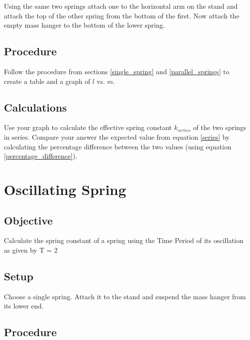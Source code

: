         Using the same two springs attach one to the horizontal arm on the stand and attach the top of the other spring from the bottom of the first. Now attach the empty mass hanger to the bottom of the lower spring.

        

    \subsection*{Procedure}

        Follow the procedure from sections \ref{single_spring} and \ref{parallel_springs} to create a table and a graph of $l$ vs. $m$.

    \subsection*{Calculations}

        Use your graph to calculate the effective spring constant $k_{series}$ of the two springs in series. Compare your answer the expected value from equation \eqref{series} by calculating the percentage difference between the two values (using equation \eqref{percentage_difference}).


\section{Oscillating Spring}

    \subsection*{Objective}

        Calculate the spring constant of a spring using the Time Period of its oscillation as given by
        \beq \label{time_period}
            T = 2 \pi {}
        \eeq

    \subsection*{Setup}

        Choose a single spring. Attach it to the stand and suspend the mass hanger from its lower end.

        

    \subsection*{Procedure}

